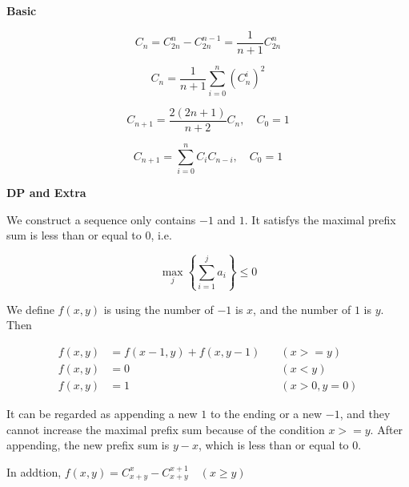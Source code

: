 \noindent\textbf{Basic}

\begin{equation*}
C_n = C_{2n}^{n} - C_{2n}^{n - 1} = \frac{1}{n + 1} C^{n}_{2n}
\end{equation*}

\begin{equation*}
C_n = \frac{1}{n+1} \sum_{i=0}^{n} (C_n^i)^2
\end{equation*}

\begin{equation*}
C_{n+1} = \frac{2(2n+1)}{n+2}C_n, \quad C_0 = 1
\end{equation*}

\begin{equation*}
C_{n+1} = \sum_{i=0}^{n} C_iC_{n-i}, \quad C_0 = 1
\end{equation*}

\noindent\textbf{DP and Extra}

We construct a sequence only contains $-1$ and $1$. It satisfys the maximal prefix sum is less than or equal to $0$, i.e.

\begin{equation*}
\max_j\left\{{\sum_{i=1}^{j}a_i}\right\} \leq 0
\end{equation*}

We define $f(x,y)$ is using the number of $-1$ is $x$, and the number of $1$ is $y$. Then

\begin{equation*}
\begin{aligned}
f(x,y) &= f(x-1,y) + f(x,y-1) &\quad (x >= y) \\
f(x,y) &= 0 &\quad (x < y) \\
f(x,y) &= 1 &\quad (x > 0, y = 0)
\end{aligned}
\end{equation*}

It can be regarded as appending a new $1$ to the ending or a new $-1$, and they cannot increase the maximal prefix sum because of the condition $x >= y$. After appending, the new prefix sum is $y - x$, which is less than or equal to $0$.

In addtion, $f(x, y) = C_{x+y}^x - C_{x+y}^{x+1} \quad (x \geq y)$

